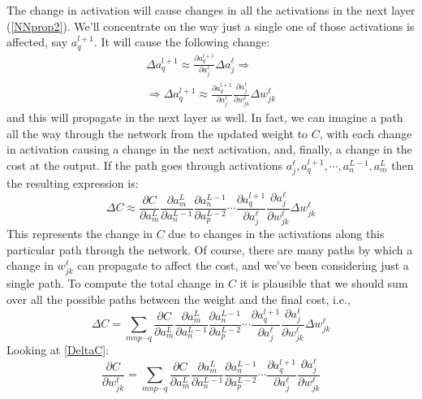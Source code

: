 \documentclass[12pt, letterpaper]{article}
\theoremstyle{definition}
\begin{document}
The change in activation will cause changes in all the activations in the next layer (\autoref{NNprop2}). We'll concentrate on the way just a single one of those activations is affected, say $a^{l+1}_q$. It will cause the following change:
\begin{equation}
\begin{aligned}
\Delta a^{l+1}_q \approx \frac{\partial a_q^{l+1}}{\partial a_j^\ell}\Delta a_j^\ell \Rightarrow\\
\Rightarrow \Delta a^{l+1}_q \approx \frac{\partial a_q^{l+1}}{\partial a_j^\ell} \frac{\partial a_j^{\ell}}{\partial w_{jk}^\ell}\Delta w_{jk}^\ell
\end{aligned}
\end{equation}
and this will propagate in the next layer as well. 
In fact, we can imagine a path all the way through the network from the updated weight to $C$, with each  change in activation causing a change in the next activation, and, finally, a change in the cost at the output. If the 
path goes through activations $a^\ell_j,a^{l+1}_q,\cdots,a^{L-1}_n,a^L_m$ then the resulting expression is:
\begin{equation}
\Delta C \approx \frac{\partial C}{\partial a^L_m} \frac{\partial a^L_m}{\partial a^{L-1}_n}\frac{\partial a^{L-1}_n}{\partial a^{L-2}_p}\cdots \frac{\partial a^{l+1}_q}{\partial a^\ell_j}\frac{\partial a^\ell_j}{\partial w^{\ell}_{jk}}\Delta w^{\ell}_{jk}
\end{equation}
This represents the change in $C$ due to changes in the activations along this particular path through the network. Of course, there are many paths by which a change in $w^\ell_{jk}$ can propagate to affect the cost, and we've been considering just a single path. To compute the total change in $C$ it is plausible that we should sum over all the possible paths between the weight and the final cost, i.e.,
\begin{equation}
\Delta C =\sum_{mnp\cdots q} \frac{\partial C}{\partial a^L_m}\frac{\partial a^L_m}{\partial a^{L-1}_n}\frac{\partial a^{L-1}_n}{\partial a^{L-2}_p}\cdots \frac{\partial a^{l+1}_q}{\partial a^\ell_j}\frac{\partial a^\ell_j}{\partial w^{\ell}_{jk}}\Delta w^{\ell}_{jk}
\end{equation}
Looking at \autoref{DeltaC}:
\begin{equation}
\frac{\partial C}{\partial w_{jk}^\ell} =  \sum_{mnp\cdots q} \frac{\partial C}{\partial a^L_m}\frac{\partial a^L_m}{\partial a^{L-1}_n}\frac{\partial a^{L-1}_n}{\partial a^{L-2}_p}\cdots \frac{\partial a^{l+1}_q}{\partial a^\ell_j}\frac{\partial a^\ell_j}{\partial w^{\ell}_{jk}}
\end{equation}
\end{document}
